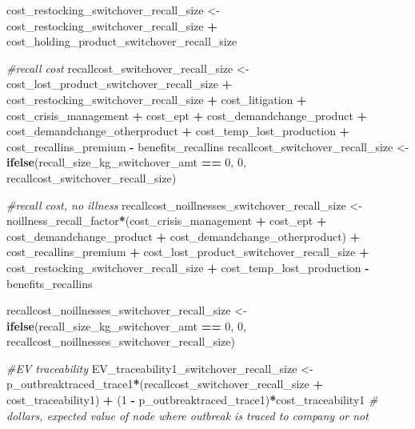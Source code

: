\documentclass[
]{article}
\newenvironment{Shaded}{\begin{snugshade}}{\end{snugshade}}
\newcommand{\CommentTok}[1]{\textcolor[rgb]{0.56,0.35,0.01}{\textit{#1}}}
\newcommand{\DecValTok}[1]{\textcolor[rgb]{0.00,0.00,0.81}{#1}}
\newcommand{\FunctionTok}[1]{\textcolor[rgb]{0.13,0.29,0.53}{\textbf{#1}}}
\newcommand{\NormalTok}[1]{#1}
\newcommand{\OtherTok}[1]{\textcolor[rgb]{0.56,0.35,0.01}{#1}}
\newcommand{\SpecialCharTok}[1]{\textcolor[rgb]{0.81,0.36,0.00}{\textbf{#1}}}
\begin{document}
\begin{Shaded}
\begin{Highlighting}[]
\NormalTok{cost\_restocking\_switchover\_recall\_size }\OtherTok{\textless{}{-}}\NormalTok{ cost\_restocking\_switchover\_recall\_size }\SpecialCharTok{+}\NormalTok{ cost\_holding\_product\_switchover\_recall\_size}


\CommentTok{\#recall cost}
\NormalTok{recallcost\_switchover\_recall\_size }\OtherTok{\textless{}{-}}\NormalTok{ cost\_lost\_product\_switchover\_recall\_size }\SpecialCharTok{+}\NormalTok{ cost\_restocking\_switchover\_recall\_size }\SpecialCharTok{+}\NormalTok{ cost\_litigation }\SpecialCharTok{+}\NormalTok{ cost\_crisis\_management }\SpecialCharTok{+}\NormalTok{ cost\_ept }\SpecialCharTok{+}\NormalTok{ cost\_demandchange\_product }\SpecialCharTok{+}\NormalTok{ cost\_demandchange\_otherproduct }\SpecialCharTok{+}\NormalTok{ cost\_temp\_lost\_production }\SpecialCharTok{+}\NormalTok{ cost\_recallins\_premium  }\SpecialCharTok{{-}}\NormalTok{ benefits\_recallins}
\NormalTok{recallcost\_switchover\_recall\_size }\OtherTok{\textless{}{-}} \FunctionTok{ifelse}\NormalTok{(recall\_size\_kg\_switchover\_amt }\SpecialCharTok{==} \DecValTok{0}\NormalTok{, }\DecValTok{0}\NormalTok{, recallcost\_switchover\_recall\_size)}


\CommentTok{\#recall cost, no illness}
\NormalTok{recallcost\_noillnesses\_switchover\_recall\_size }\OtherTok{\textless{}{-}}\NormalTok{ noillness\_recall\_factor}\SpecialCharTok{*}\NormalTok{(cost\_crisis\_management }\SpecialCharTok{+}\NormalTok{ cost\_ept }\SpecialCharTok{+}\NormalTok{ cost\_demandchange\_product }\SpecialCharTok{+}\NormalTok{ cost\_demandchange\_otherproduct) }\SpecialCharTok{+}\NormalTok{ cost\_recallins\_premium }\SpecialCharTok{+}\NormalTok{ cost\_lost\_product\_switchover\_recall\_size }\SpecialCharTok{+}\NormalTok{ cost\_restocking\_switchover\_recall\_size }\SpecialCharTok{+}\NormalTok{ cost\_temp\_lost\_production  }\SpecialCharTok{{-}}\NormalTok{ benefits\_recallins}


\NormalTok{recallcost\_noillnesses\_switchover\_recall\_size }\OtherTok{\textless{}{-}} \FunctionTok{ifelse}\NormalTok{(recall\_size\_kg\_switchover\_amt }\SpecialCharTok{==} \DecValTok{0}\NormalTok{, }\DecValTok{0}\NormalTok{, recallcost\_noillnesses\_switchover\_recall\_size)}


\CommentTok{\#EV traceability}
\NormalTok{EV\_traceability1\_switchover\_recall\_size }\OtherTok{\textless{}{-}}\NormalTok{ p\_outbreaktraced\_trace1}\SpecialCharTok{*}\NormalTok{(recallcost\_switchover\_recall\_size }\SpecialCharTok{+}\NormalTok{ cost\_traceability1) }\SpecialCharTok{+}\NormalTok{ (}\DecValTok{1} \SpecialCharTok{{-}}\NormalTok{ p\_outbreaktraced\_trace1)}\SpecialCharTok{*}\NormalTok{cost\_traceability1 }\CommentTok{\# dollars, expected value of node where outbreak is traced to company or not}



\end{Highlighting}
\end{Shaded}
\end{document}
